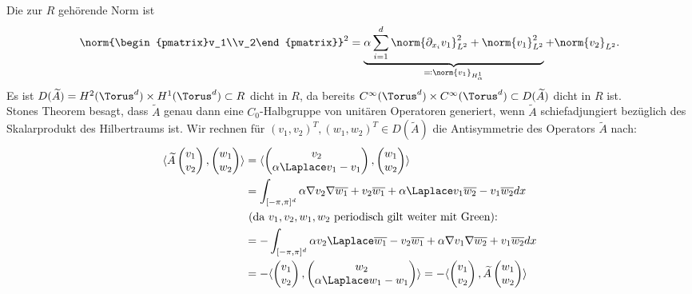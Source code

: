 Die zur $R$ gehörende Norm ist
\[\norm{\begin{pmatrix}v_1\\v_2\end{pmatrix}}^2=\underbrace{\alpha \sum_{i=1}^d\norm{\partial_{x_i} v_1}^2_{L^2}+\norm{v_1}_{L^2}^2}_{\eqqcolon\norm{v_1}_{H^1_\alpha}}+\norm{v_2}_{L^2}.\]
Es ist $D(\widetilde{A})=H^2(\Torus^d)\times H^1(\Torus^d)\subset R$ dicht in $R$, da bereits $C^\infty(\Torus^d)\times C^\infty(\Torus^d)\subset D(\widetilde{A})$ dicht in $R$ ist.\\
Stones Theorem besagt, dass $\widetilde{A}$ genau dann eine $C_0$-Halbgruppe von unitären Operatoren generiert, wenn $\widetilde{A}$ schiefadjungiert bezüglich des Skalarprodukt des Hilbertraums ist. Wir rechnen für $(v_1,v_2)^T, (w_1,w_2)^T\in D(\widetilde{A})$ die Antisymmetrie des Operators $\widetilde{A}$ nach:
\begin{align*}
\langle \widetilde{A}\begin{pmatrix}v_1\\v_2\end{pmatrix}, \begin{pmatrix}w_1\\w_2\end{pmatrix}\rangle
&=\langle \begin{pmatrix} v_2\\\alpha \Laplace v_1-v_1\end{pmatrix}, \begin{pmatrix}w_1\\w_2\end{pmatrix}\rangle\\
&=\int_{[-\pi,\pi]^d} \alpha \nabla v_2\nabla \overline{w_1} +v_2\overline{w_1}+ \alpha \Laplace v_1 \overline{w_2} - v_1\overline{w_2}dx\\
&\text{ (da $v_1,v_2,w_1,w_2$ periodisch gilt weiter mit Green):}\\
&=-\int_{[-\pi,\pi]^d}\alpha v_2\Laplace \overline{w_1}-v_2\overline{w_1}+ \alpha \nabla v_1\nabla \overline{w_2} + v_1\overline{w_2}dx\\
&=-\langle \begin{pmatrix} v_1\\ v_2\end{pmatrix}, \begin{pmatrix} w_2\\\alpha \Laplace w_1-w_1\end{pmatrix}\rangle=-\langle \begin{pmatrix}v_1\\v_2\end{pmatrix}, \widetilde{A}\begin{pmatrix}w_1\\w_2\end{pmatrix}\rangle
\end{align*}
